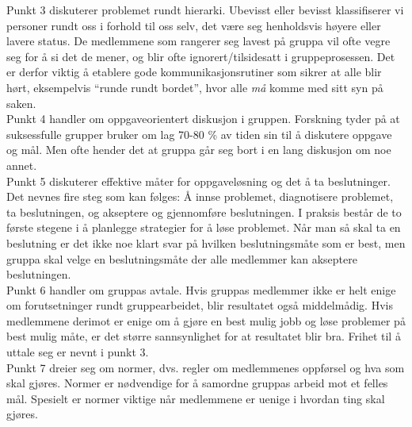 Punkt 3 diskuterer problemet rundt hierarki. Ubevisst eller bevisst
klassifiserer vi personer rundt oss i forhold til oss selv, det være seg
henholdsvis høyere eller lavere status. De medlemmene som rangerer seg lavest på
gruppa vil ofte vegre seg for å si det de mener, og blir ofte
ignorert/tilsidesatt i gruppeprosessen. Det er derfor viktig å etablere gode
kommunikasjonsrutiner som sikrer at alle blir hørt, eksempelvis ``runde rundt
bordet'', hvor alle \emph{må} komme med sitt syn på saken. \\


Punkt 4 handler om oppgaveorientert diskusjon i gruppen. Forskning tyder på at suksessfulle grupper bruker om lag 70-80 \% av tiden sin til å diskutere oppgave og mål. Men ofte hender det at gruppa går seg bort i en lang diskusjon om noe annet. \\

Punkt 5 diskuterer effektive måter for oppgaveløsning og det å ta beslutninger. Det nevnes fire steg som kan følges: Å innse problemet, diagnotisere problemet, ta beslutningen, og akseptere og gjennomføre beslutningen. I praksis består de to første stegene i å planlegge strategier for å løse problemet. Når man så skal ta en beslutning er det ikke noe klart svar på hvilken beslutningsmåte som er best, men gruppa skal velge en beslutningsmåte der alle medlemmer kan akseptere beslutningen.  \\

Punkt 6 handler om gruppas avtale. Hvis gruppas medlemmer ikke er helt enige om forutsetninger rundt gruppearbeidet, blir resultatet også middelmådig. Hvis medlemmene derimot er enige om å gjøre en best mulig jobb og løse problemer på best mulig måte, er det større sannsynlighet for at resultatet blir bra. Frihet til å uttale seg er nevnt i punkt 3. \\

Punkt 7 dreier seg om normer, dvs. regler om medlemmenes oppførsel og hva som skal gjøres. Normer er nødvendige for å samordne gruppas arbeid mot et felles mål. Spesielt er normer viktige når medlemmene er uenige i hvordan ting skal gjøres. \\

